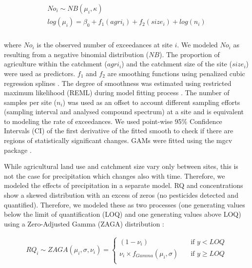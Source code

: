 \documentclass[journal=esthag,manuscript=article]{achemso}
\begin{document}
\begin{align}
\begin{split}
  No_i \sim NB(\mu_i, \kappa) \\
  log(\mu_i)= \beta_0 + f_1(agri_i) + f_2(size_i) + log(n_i) \\
\end{split}
\end{align}

where $No_i$ is the observed number of exceedances at site $i$. 
We modeled $No_i$ as resulting from a negative binomial distribution ($NB$).
The proportion of agriculture within the catchment ($agri_i$) and the catchment size of the site ($size_i$) were used as predictors. 
$f_1$ and $f_2$ are smoothing functions using penalized cubic regression splines \citep{wood_generalized_2006}.
The degree of smoothness was estimated using restricted maximum likelihood (REML) during model fitting process \citep{wood_fast_2011}.
The number of samples per site ($n_i$) was used as an offset to account different sampling efforts (sampling interval and analysed compound spectrum) at a site and is equivalent to modeling the rate of exceedances. 
We used point-wise 95\% Confidence Intervals (CI) of the first derivative of the fitted smooth to check if there are regions of statistically significant changes.
GAMs were fitted using the mgcv package \citep{wood_fast_2011}.

While agricultural land use and catchment size vary only between sites, this is not the case for precipitation which changes also with time.
Therefore, we modeled the effects of precipitation in a separate model.
RQ and concentrations show a skewed distribution with an excess of zeros (no pesticides detected and quantified). 
Therefore, we modeled these as two processes (one generating values below the limit of quantification (LOQ) and one generating values above LOQ) using a Zero-Adjusted Gamma (ZAGA) distribution \cite{rigby_generalized_2005,stasinopoulos_gamlss.dist:_2016}:

\begin{align}
RQ_i \sim ZAGA(\mu_i, \sigma, \nu_i) = 
  \begin{cases}
    (1 - \nu_i)   & \quad  \text{if } y < LOQ \\
    \nu_i \times f_{Gamma} (\mu_i, \sigma) & \quad \text{if } y \ge LOQ \\
  \end{cases}
  \label{eqn:eqn3}
\end{align}
\end{document}
